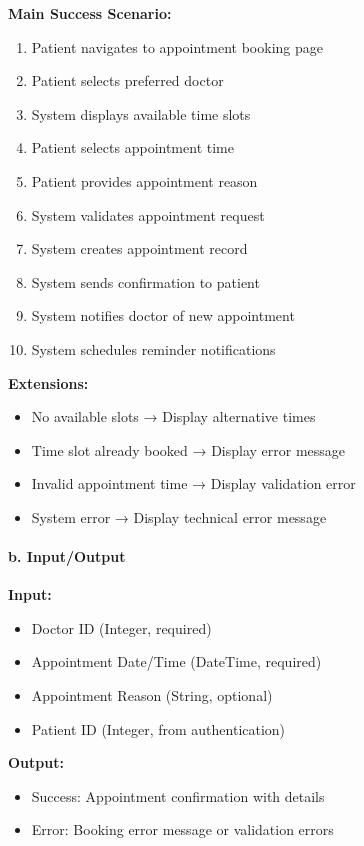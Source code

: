 \documentclass[12pt,a4paper]{article}
\begin{document}
\textbf{Main Success Scenario:}
\begin{enumerate}
    \item Patient navigates to appointment booking page
    \item Patient selects preferred doctor
    \item System displays available time slots
    \item Patient selects appointment time
    \item Patient provides appointment reason
    \item System validates appointment request
    \item System creates appointment record
    \item System sends confirmation to patient
    \item System notifies doctor of new appointment
    \item System schedules reminder notifications
\end{enumerate}

\textbf{Extensions:}
\begin{itemize}
    \item No available slots → Display alternative times
    \item Time slot already booked → Display error message
    \item Invalid appointment time → Display validation error
    \item System error → Display technical error message
\end{itemize}

\paragraph{b. Input/Output}

\textbf{Input:}
\begin{itemize}
    \item Doctor ID (Integer, required)
    \item Appointment Date/Time (DateTime, required)
    \item Appointment Reason (String, optional)
    \item Patient ID (Integer, from authentication)
\end{itemize}

\textbf{Output:}
\begin{itemize}
    \item Success: Appointment confirmation with details
    \item Error: Booking error message or validation errors
\end{itemize}
\end{document}
